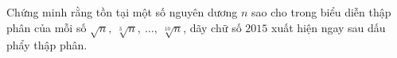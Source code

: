 \ifshowproblem
\begin{problem}\label{example:RUS-2015-TMO-J-P4}
    Chứng minh rằng tồn tại một số nguyên dương \( n \) sao cho trong biểu diễn thập phân của mỗi số 
    \( \sqrt{n},\ \sqrt[3]{n},\ \ldots,\ \sqrt[10]{n} \), dãy chữ số \(2015\) xuất hiện ngay sau dấu phẩy thập phân.
\end{problem}
\fi

\footnotemark
{}
\fi